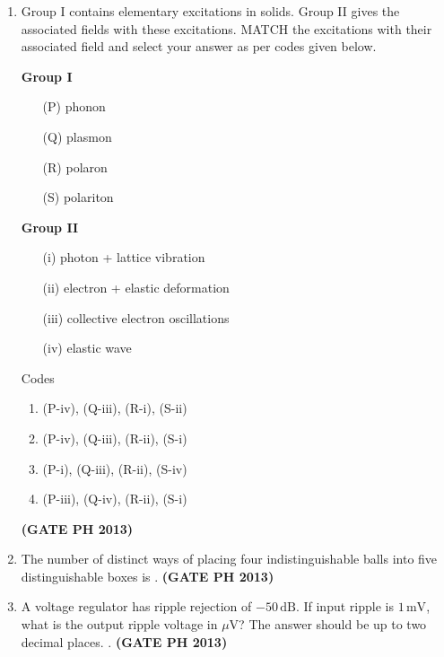 \documentclass[14pt, a4paper]{extarticle}
\begin{document}
\begin{enumerate}[label=\textbf{Q. \arabic*}]
\item Group I contains elementary excitations in solids. Group II gives the associated fields with these excitations. MATCH the excitations with their associated field and select your answer as per codes given below.
\begin{center}
    \begin{multicols}{2}
        \textbf{Group I}
        \begin{itemize}
            \item[(P)] phonon
            \item[(Q)] plasmon
            \item[(R)] polaron
            \item[(S)] polariton
        \end{itemize}
        \textbf{Group II}
        \begin{itemize}
            \item[(i)] photon + lattice vibration
            \item[(ii)] electron + elastic deformation
            \item[(iii)] collective electron oscillations
            \item[(iv)] elastic wave
        \end{itemize}
    \end{multicols}
\end{center}
Codes
\begin{enumerate}
    \item (P-iv), (Q-iii), (R-i), (S-ii)
    \item (P-iv), (Q-iii), (R-ii), (S-i)
    \item (P-i), (Q-iii), (R-ii), (S-iv)
    \item (P-iii), (Q-iv), (R-ii), (S-i)
\end{enumerate}
\hfill \textbf{(GATE PH 2013)}

\item The number of distinct ways of placing four indistinguishable balls into five distinguishable boxes is \underline{\hspace{5em}}.
\hfill \textbf{(GATE PH 2013)}

\item A voltage regulator has ripple rejection of $-50\,\text{dB}$. If input ripple is $1\,\text{mV}$, what is the output ripple voltage in $\mu\text{V}$? The answer should be up to two decimal places. \underline{\hspace{5em}}.
\hfill \textbf{(GATE PH 2013)}


\end{enumerate}
\end{document}
